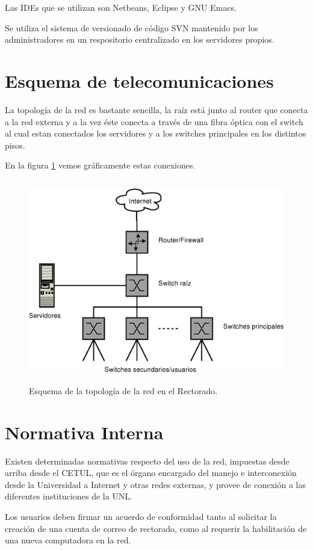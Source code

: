 \documentclass[a4paper,11pt,oneside]{article}
\begin{document}
Las IDEs que se utilizan son Netbeans, Eclipse y GNU Emacs.

Se utiliza el sistema de versionado de código SVN mantenido por los
administradores en un respositorio centralizado en los servidores
propios.
%
\section{Esquema de telecomunicaciones}
La topología de la red es bastante sencilla, la raíz está junto al router que conecta a la red externa y a la vez éste conecta a través de una fibra óptica con el switch al cual estan conectados los servidores y a los switches principales en los distintos pisos.

En la figura \ref{topologia} vemos gráficamente estas conexiones.
%
\begin{figure}
  \center\includegraphics[height=89mm]{img/red}
  \caption{Esquema de la topología de la red en el Rectorado.}
  \label{topologia}
\end{figure}
\section{Normativa Interna}
%
Existen determinadas normativas respecto del uso de la red, impuestas
desde arriba desde el CETUL, que es el órgano encargado del manejo e
interconexión desde la Universidad a Internet y otras redes externas,
y provee de conexión a las diferentes instituciones de la UNL.

Los usuarios deben firmar un acuerdo de conformidad tanto al solicitar
la creación de una cuenta de correo de rectorado, como al requerir la
habilitación de una nueva computadora en la red.
\end{document}
